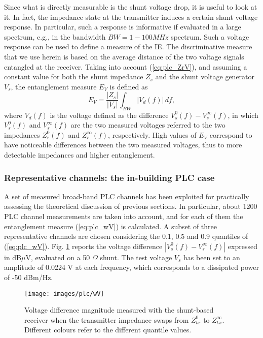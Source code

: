 Since what is directly measurable is the shunt voltage drop, it is useful to look at it. In fact, the impedance state at the transmitter induces a certain shunt voltage response. In particular, such a response is informative if evaluated in a large spectrum, e.g., in the bandwidth $BW={1-100} MHz$ spectrum. Such a voltage response can be used to define a measure of the IE. The discriminative measure that we use herein is based on the average distance of the two voltage signals entangled at the receiver. Taking into account (\ref{eq:plc_ZrV}), and assuming a constant value for both the shunt impedance $Z_s$ and the shunt voltage generator $V_s$, the entanglement measure $E_V$ is defined as
\begin{equation}
	E_V = \frac{|Z_s|}{|V_s|} \int_{BW} |V_d(f)|\,df,
	\label{eq:plc_wV}
\end{equation}
where $V_d(f)$ is the voltage defined as the difference $V_s^{0}(f)-V_s^{\infty}(f)$, in which $V_s^{0}(f)$ and $V_s^{\infty}(f)$ are the two measured voltages referred to the two impedances $Z_r^{0}(f)$ and $Z_r^{\infty}(f)$, respectively.
High values of $E_V$ correspond to have noticeable differences between the two measured voltages, thus to more detectable impedances and higher entanglement.

\subsubsection{Representative channels: the in-building PLC case}
A set of measured broad-band PLC channels has been exploited for practically assessing the theoretical discussion of previous sections. In particular, about 1200 PLC channel measurements are taken into account, and for each of them the entanglement measure (\ref{eq:plc_wV}) is calculated. A subset of three representative channels are chosen considering the 0.1, 0.5 and 0.9 quantiles of (\ref{eq:plc_wV}). Fig. \ref{fig:plc_wV} reports the voltage difference $|V_s^{0}(f)-V_s^{\infty}(f)|$ expressed in dB$\mu$V, evaluated on a 50 $\Omega$ shunt. The test voltage $V_s$ has been set to an amplitude of 0.0224 V at each frequency, which corresponds to a dissipated power of -50 dBm/Hz.
  \begin{figure}
  \centering
	\texttt{[image: images/plc/wV]}
	\caption{Voltage difference magnitude measured with the shunt-based receiver when the transmitter impedance swaps from $Z_{tx}^{0}$ to $Z_{tx}^{\infty}$. Different colours refer to the different quantile values.}
	\label{fig:plc_wV}
\end{figure}

